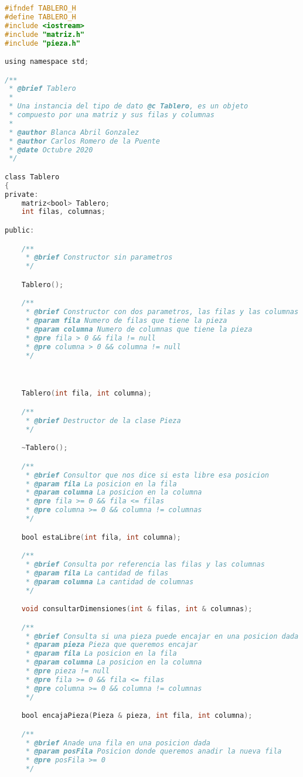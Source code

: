 \documentclass[12pt, spanish]{article}
\begin{document}
\begin{lstlisting}[language=C]
#ifndef TABLERO_H
#define TABLERO_H
#include <iostream>
#include "matriz.h"
#include "pieza.h"

using namespace std;

/**
 * @brief Tablero
 *
 * Una instancia del tipo de dato @c Tablero, es un objeto
 * compuesto por una matriz y sus filas y columnas  
 *
 * @author Blanca Abril Gonzalez
 * @author Carlos Romero de la Puente
 * @date Octubre 2020
 */

class Tablero
{
private:
	matriz<bool> Tablero;
	int filas, columnas;

public:

	/**
	 * @brief Constructor sin parametros
	 */

	Tablero();

	/**
	 * @brief Constructor con dos parametros, las filas y las columnas
	 * @param fila Numero de filas que tiene la pieza
	 * @param columna Numero de columnas que tiene la pieza
	 * @pre fila > 0 && fila != null
	 * @pre columna > 0 && columna != null
	 */



	Tablero(int fila, int columna);

	/**
	 * @brief Destructor de la clase Pieza
	 */

	~Tablero();

	/**
	 * @brief Consultor que nos dice si esta libre esa posicion
	 * @param fila La posicion en la fila
	 * @param columna La posicion en la columna
	 * @pre fila >= 0 && fila <= filas
	 * @pre columna >= 0 && columna != columnas
	 */

	bool estaLibre(int fila, int columna);

	/**
	 * @brief Consulta por referencia las filas y las columnas
	 * @param fila La cantidad de filas
	 * @param columna La cantidad de columnas
	 */

	void consultarDimensiones(int & filas, int & columnas);

	/**
	 * @brief Consulta si una pieza puede encajar en una posicion dada
	 * @param pieza Pieza que queremos encajar
	 * @param fila La posicion en la fila
	 * @param columna La posicion en la columna
	 * @pre pieza != null
	 * @pre fila >= 0 && fila <= filas
	 * @pre columna >= 0 && columna != columnas
	 */

	bool encajaPieza(Pieza & pieza, int fila, int columna);

	/**
	 * @brief Anade una fila en una posicion dada
	 * @param posFila Posicion donde queremos anadir la nueva fila
	 * @pre posFila >= 0
	 */


\end{lstlisting}
\end{document}
